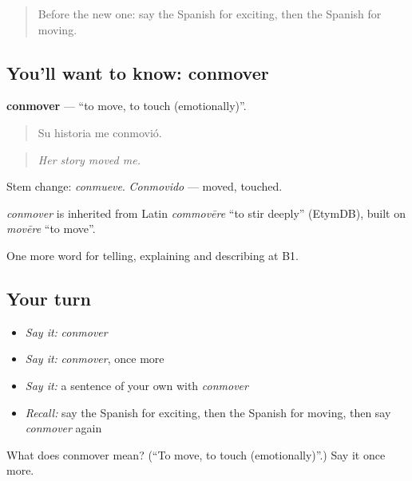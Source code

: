 \label{lesson:ES-C711-conmover}



\begin{quote}
Before the new one: say the Spanish for exciting, then the Spanish for moving.
\end{quote}

\subsection*{You'll want to know: conmover}
\textbf{conmover} — \textquotedblleft{}to move, to touch (emotionally)\textquotedblright{}.

\begin{quote}
Su historia me conmovió.
\end{quote}

\begin{quote}
\emph{Her story moved me.}
\end{quote}

Stem change: \emph{conmueve}. \emph{Conmovido} — moved, touched.

\begin{cousinweb}
\emph{conmover} is inherited from Latin \emph{commovēre} \textquotedblleft{}to stir deeply\textquotedblright{} (EtymDB), built on \emph{movēre} \textquotedblleft{}to move\textquotedblright{}.
\end{cousinweb}

\begin{grammarlens}[title={What you've built}]
One more word for telling, explaining and describing at B1.
\end{grammarlens}

\subsection*{Your turn}
\begin{itemize}
\raggedright
  \item \emph{Say it:} \emph{conmover}
  \item \emph{Say it:} \emph{conmover}, once more
  \item \emph{Say it:} a sentence of your own with \emph{conmover}
  \item \emph{Recall:} say the Spanish for exciting, then the Spanish for moving, then say \emph{conmover} again
\end{itemize}

\begin{tcolorbox}[breakable,colback=teal!4,colframe=teal!35!black,title={Before you move on}]
What does conmover mean? (\textquotedblleft{}To move, to touch (emotionally)\textquotedblright{}.) Say it once more.
\end{tcolorbox}
